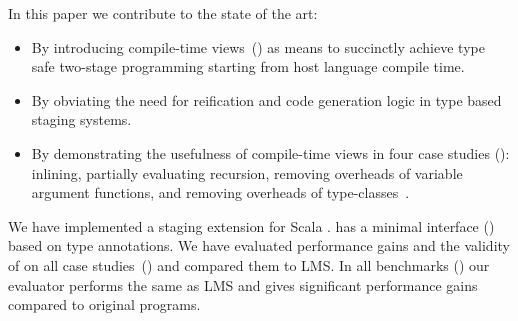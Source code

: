 In this paper we contribute to the state of the art:
\begin{itemize}

 \item By introducing compile-time views~() as means to succinctly achieve
  type safe two-stage programming starting from host language compile time.

 \item By obviating the need for reification and code generation logic in type based staging systems.

 \item By demonstrating the usefulness of compile-time views in four case
  studies (): inlining, partially evaluating recursion,
  removing overheads of variable argument functions, and removing overheads of
  type-classes~\cite{wadler1989make,hall_type_1996,oliveira_type_2010}.

\end{itemize}

We have implemented a staging extension for Scala \tool \footnotemark[3].
 \tool has a minimal interface () based on type annotations.
 We have evaluated performance gains and the validity of \tool on all case
 studies~() and compared them to LMS. In all benchmarks ()
 our evaluator performs the same as LMS and gives significant performance gains compared to original programs.

